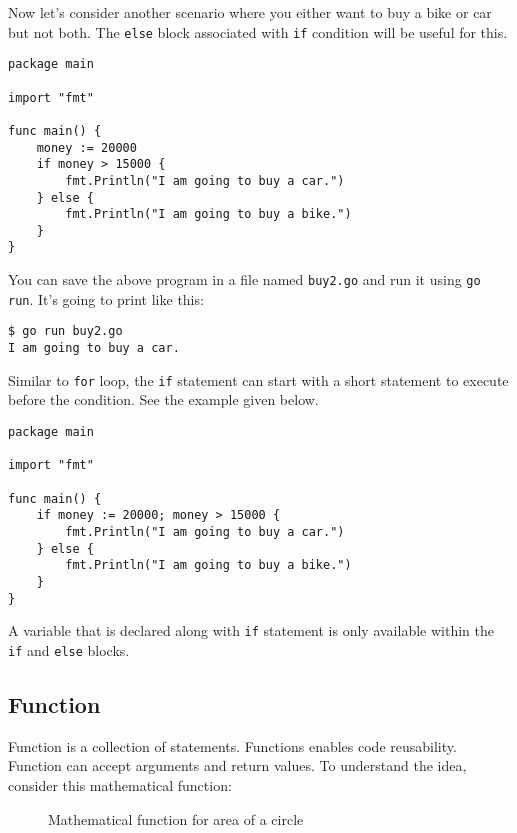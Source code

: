 Now let's consider another scenario where you either want to buy a
bike or car but not both.  The \texttt{else} block associated with
\texttt{if} condition will be useful for this.

\begin{lstlisting}[caption=If with else block]
package main

import "fmt"

func main() {
    money := 20000
    if money > 15000 {
        fmt.Println("I am going to buy a car.")
    } else {
        fmt.Println("I am going to buy a bike.")
    }
}
\end{lstlisting}

You can save the above program in a file named \texttt{buy2.go} and
run it using \texttt{go run}.  It's going to print like this:

\begin{lstlisting}[numbers=none]
$ go run buy2.go
I am going to buy a car.
\end{lstlisting}

Similar to \texttt{for} loop, the \texttt{if} statement can start with
a short statement to execute before the condition.  See the example
given below.

\begin{lstlisting}[caption=If with initialization statement]
package main

import "fmt"

func main() {
    if money := 20000; money > 15000 {
        fmt.Println("I am going to buy a car.")
    } else {
        fmt.Println("I am going to buy a bike.")
    }
}
\end{lstlisting}

A variable that is declared along with \texttt{if} statement is only
available within the \texttt{if} and \texttt{else} blocks.

\subsection{Function}

Function is a collection of statements.  Functions
enables code reusability.  Function can accept arguments and return
values.  To understand the idea, consider this mathematical function:

\begin{figure}[h!]
\centering
{}
\caption{Mathematical function for area of a circle}
\end{figure}

